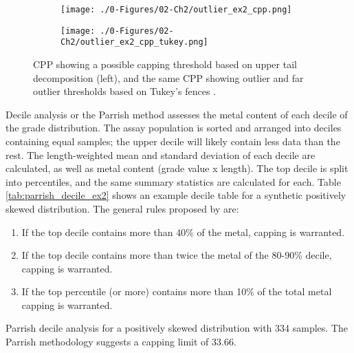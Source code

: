 \begin{figure}[!htb]
    \begin{subfigure}{0.5\textwidth}
        \centering
        \texttt{[image: ./0-Figures/02-Ch2/outlier\_ex2\_cpp.png]}
    \end{subfigure}
    \begin{subfigure}{0.5\textwidth}
        \centering
        \texttt{[image: ./0-Figures/02-Ch2/outlier\_ex2\_cpp\_tukey.png]}
    \end{subfigure}
    \caption{\gls{CPP} showing a possible capping threshold based on upper tail decomposition (left), and the same \gls{CPP} showing outlier and far outlier thresholds based on Tukey's fences \citep{tukey1977exploratory}.}
    \label{fig:cpp}
\end{figure}

Decile analysis or the Parrish method \citep{parrish1997geologist} assesses the metal content of each decile of the grade distribution. The assay population is sorted and arranged into deciles containing equal samples; the upper decile will likely contain less data than the rest. The length-weighted mean and standard deviation of each decile are calculated, as well as metal content (grade value x length). The top decile is split into percentiles, and the same summary statistics are calculated for each. Table \ref{tab:parrish_decile_ex2} shows an example decile table for a synthetic positively skewed distribution. The general rules proposed by \cite{parrish1997geologist} are:
\begin{enumerate}[noitemsep]
    \item If the top decile contains more than 40\% of the metal, capping is warranted.
    \item If the top decile contains more than twice the metal of the 80-90\% decile, capping is warranted.
    \item If the top percentile (or more) contains more than 10\% of the total metal capping is warranted.
\end{enumerate}

\begin{table}[!htb]
    \centering
    \caption{Parrish decile analysis for a positively skewed distribution with 334 samples. The Parrish methodology suggests a capping limit of 33.66.}
    \resizebox{1\width}{!}{}
    \label{tab:parrish_decile_ex2}
\end{table}

